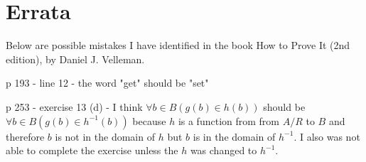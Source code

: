 \documentclass{article}
\begin{document}
\section*{Errata}

Below are possible mistakes I have identified in the book How to Prove It (2nd edition), by Daniel J. Velleman. 


\begin{description}
\item p 193 - line 12 - the word "get" should be "set"

\item p 253 - exercise 13 (d) - I think $\forall b \in B(g(b) \in h(b))$ should be $\forall b \in B(g(b) \in h^{-1}(b))$ because $h$ is a function from from $A/R$ to $B$ and therefore $b$ is not in the domain of $h$ but $b$ is in the domain of $h^{-1}$. I also was not able to complete the exercise unless the $h$ was changed to $h^{-1}$.
\end{description}
\end{document}
